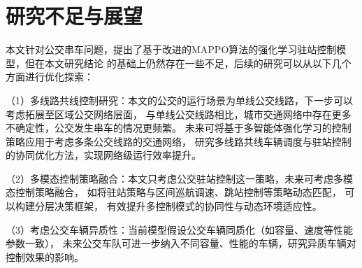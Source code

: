 

\section{研究不足与展望}
本文针对公交串车问题，提出了基于改进的MAPPO算法的强化学习驻站控制模型，但在本文研究结论
的基础上仍然存在一些不足，后续的研究可以从以下几个方面进行优化探索：

（1）多线路共线控制研究：本文的公交的运行场景为单线公交线路，下一步可以考虑拓展至区域公交网络层面，
与单线公交线路相比，城市交通网络中存在更多不确定性，公交发生串车的情况更频繁。
未来可将基于多智能体强化学习的控制策略应用于考虑多条公交线路的交通网络，
研究多线路共线车辆调度与驻站控制的协同优化方法，实现网络级运行效率提升。

（2）多模态控制策略融合：本文只考虑公交驻站控制这一策略，未来可考虑多模态控制策略融合，
如将驻站策略与区间巡航调速、跳站控制等策略动态匹配，
可以构建分层决策框架，
有效提升多控制模式的协同性与动态环境适应性。

（3）考虑公交车辆异质性：当前模型假设公交车辆同质化（如容量、速度等性能参数一致），
未来公交车队可进一步纳入不同容量、性能的车辆，研究异质车辆对控制效果的影响。

